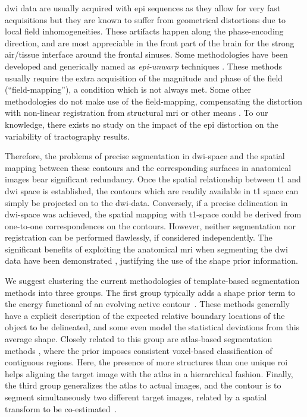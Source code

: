 \gls{dwi} data are usually acquired with \gls{epi} sequences 
as they allow for very fast acquisitions but they are known to 
suffer from geometrical distortions due to local field inhomogeneities. 
These artifacts happen along the phase-encoding direction, and are most 
appreciable in the front part of the brain for the strong air/tissue 
interface around the frontal sinuses. Some methodologies have
been developed and generically named as \emph{\gls{epi}-unwarp} techniques
\cite{holland_efficient_2010,hsu_correction_2009,jezzard_characterization_2005,
reber_correction_2005}. These methods usually 
require the extra acquisition of the magnitude and phase of
the field (``field-mapping''), a condition which is not always met. Some other 
methodologies do not make use of the field-mapping, compensating the distortion
with non-linear registration from structural \gls{mri} or other means
\citep{andersson_modeling_2001}. To our knowledge, there exists no study
on the impact of the \gls{epi} distortion on the variability of tractography
results. 

Therefore, the problems of precise segmentation in \gls{dwi}-space and the 
spatial mapping between these contours and the corresponding surfaces in 
anatomical images bear significant redundancy. Once the spatial relationship 
between \gls{t1} and \gls{dwi} space is established, the contours which are 
readily available in \gls{t1} space can simply be projected on to the 
\gls{dwi}-data. Conversely, if a precise delineation in \gls{dwi}-space 
was achieved, the spatial mapping with \gls{t1}-space could be derived 
from one-to-one correspondences on the contours. However, neither segmentation 
nor registration can be performed flawlessly, if considered independently. 
The significant benefits of exploiting the anatomical \gls{mri} when 
segmenting the \gls{dwi} data have been demonstrated \cite{zollei_improved_2010}, 
justifying the use of the shape prior information. 

We suggest clustering the current methodologies of template-based segmentation 
methods into three groups. The first group typically adds a shape prior term to 
the energy functional of an evolving active contour~\citep{Bresson2006a,Chan2005,
Chen2002,Cremers2006,Gastaud2004,Paragios2003,Vemuri2003a,Yezzi2003a}.
These methods generally have a explicit description of the expected relative boundary 
locations of the object to be delineated, and some even model the statistical deviations
from this average shape. Closely related to this group are atlas-based segmentation
methods \citep{Gorthi2011,Gorthi2009,Pohl2005,Pohl2006,Wang2006}, where the prior 
imposes consistent voxel-based classification of contiguous regions. Here, the 
presence of more structures than one unique \gls{roi} helps aligning the target image 
with the atlas in a hierarchical fashion. Finally, the third group generalizes 
the atlas to actual images, and the contour is to segment simultaneously two 
different target images, related by a spatial transform to be co-estimated~\citep{Wyatt2003,
Yezzi2003}.

